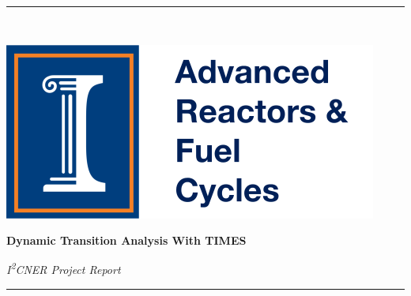 \documentclass[14pt,a4paper]{article} %
\begin{document}
\sloppy


\begin{titlepage} %
    \newcommand{\HRule}{\rule{\linewidth}{0.5mm}} %
    
    \center %

    
    \HRule\\[0.2cm]
    
     \begin{minipage}{0.4\textwidth}
        \includegraphics[width=\textwidth]{arfc-logo}
        \end{minipage}%
        \begin{minipage}{0.6\textwidth}
        {\begin{flushright}\huge\bfseries Dynamic Transition Analysis With TIMES\end{flushright}}
        {\begin{flushright}\large\textit{I\textsuperscript{2}CNER Project Report}\end{flushright}}

        \end{minipage}

    \vspace{0.2cm}
    \HRule
    \vspace{0.5cm}
    
    

\end{titlepage}
\end{document}
